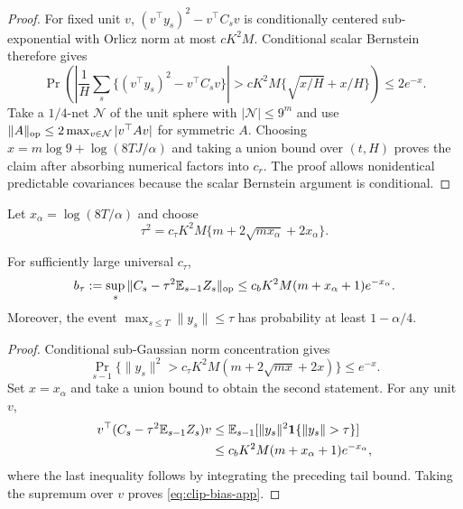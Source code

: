 \begin{proof}
For fixed unit $v$, $(v^\top y_s)^2-v^\top C_sv$ is conditionally centered sub-exponential with Orlicz norm at most $cK^2M$.  Conditional scalar Bernstein therefore gives
\begin{equation}
 \Pr\left(\left|\frac1H\sum_s\{(v^\top y_s)^2-v^\top C_sv\}\right|>cK^2M\{\sqrt{x/H}+x/H\}\right)\le2e^{-x}.
\end{equation}
Take a $1/4$-net $\mathcal N$ of the unit sphere with $|\mathcal N|\le9^m$ and use $\|A\|_{\mathrm{op}}\le2\max_{v\in\mathcal N}|v^\top Av|$ for symmetric $A$.  Choosing $x=m\log9+\log(8TJ/\alpha)$ and taking a union bound over $(t,H)$ proves the claim after absorbing numerical factors into $c_r$.  The proof allows nonidentical predictable covariances because the scalar Bernstein argument is conditional.  \end{proof}

Let $x_\alpha=\log(8T/\alpha)$ and choose
\begin{equation}
 \tau^2=c_\tau K^2M\{m+2\sqrt{mx_\alpha}+2x_\alpha\}.
 \label{eq:tau-app}
\end{equation}

\begin{lemma}
\label{lem:clip}
For sufficiently large universal $c_\tau$,
\begin{equation}
 b_\tau:=\sup_s\|C_s-\tau^2\mathbb E_{s-1}Z_s\|_{\mathrm{op}}
 \le c_bK^2M(m+x_\alpha+1)e^{-x_\alpha}.
 \label{eq:clip-bias-app}
\end{equation}
Moreover, the event $\max_{s\le T}\|y_s\|\le\tau$ has probability at least $1-\alpha/4$.
\end{lemma}

\begin{proof}
Conditional sub-Gaussian norm concentration gives
\begin{equation}
 \Pr_{s-1}\{\|y_s\|^2>c_\tau K^2M(m+2\sqrt{mx}+2x)\}\le e^{-x}.
\end{equation}
Set $x=x_\alpha$ and take a union bound to obtain the second statement.  For any unit $v$,
\begin{align}
 v^\top(C_s-\tau^2\E_{s-1}Z_s)v
 &\le \E_{s-1}[\|y_s\|^2\mathbf1\{\|y_s\|>\tau\}]\\
 &\le c_bK^2M(m+x_\alpha+1)e^{-x_\alpha},
\end{align}
where the last inequality follows by integrating the preceding tail bound.  Taking the supremum over $v$ proves \eqref{eq:clip-bias-app}.  \end{proof}

